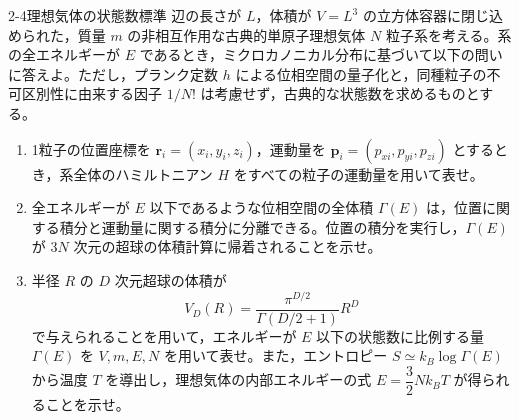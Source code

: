 
\begin{mondai}{2-4}{理想気体の状態数}{標準}
辺の長さが $L$，体積が $V = L^3$ の立方体容器に閉じ込められた，質量 $m$ の非相互作用な古典的単原子理想気体 $N$ 粒子系を考える。系の全エネルギーが $E$ であるとき，ミクロカノニカル分布に基づいて以下の問いに答えよ。ただし，プランク定数 $h$ による位相空間の量子化と，同種粒子の不可区別性に由来する因子 $1/N!$ は考慮せず，古典的な状態数を求めるものとする。

\begin{enumerate}
  \item 1粒子の位置座標を $\boldsymbol{r}_i = (x_i, y_i, z_i)$，運動量を $\boldsymbol{p}_i = (p_{xi}, p_{yi}, p_{zi})$ とするとき，系全体のハミルトニアン $H$ をすべての粒子の運動量を用いて表せ。

  \item 全エネルギーが $E$ 以下であるような位相空間の全体積 $\Gamma(E)$ は，位置に関する積分と運動量に関する積分に分離できる。位置の積分を実行し，$\Gamma(E)$ が $3N$ 次元の超球の体積計算に帰着されることを示せ。

  \item 半径 $R$ の $D$ 次元超球の体積が
  \begin{equation*}
  V_D(R) = \frac{\pi^{D/2}}{\Gamma(D/2 + 1)} R^D
  \end{equation*}
  で与えられることを用いて，エネルギーが $E$ 以下の状態数に比例する量 $\Gamma(E)$ を $V, m, E, N$ を用いて表せ。また，エントロピー $S \simeq k_B \log \Gamma(E)$ から温度 $T$ を導出し，理想気体の内部エネルギーの式 $E = \dfrac{3}{2}Nk_BT$ が得られることを示せ。
\end{enumerate}
\end{mondai}

